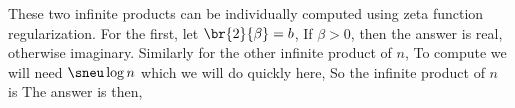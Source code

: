 These two infinite products can be individually computed using zeta function regularization. For the first, let $\br{2}{\beta}=b$,
If $\beta>0$, then the answer is real, otherwise imaginary. Similarly for the other infinite product of $n$,
To compute  we will need $\sneu \log n$ which we will do quickly here,
So the infinite product of $n$  is
The answer  is then,

